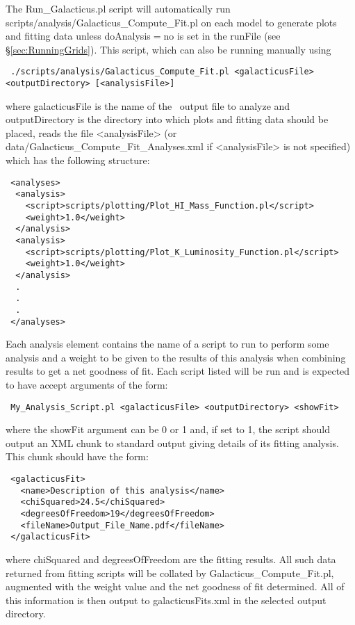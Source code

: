 The {\normalfont \ttfamily Run\_Galacticus.pl} script will automatically run {\normalfont \ttfamily scripts/analysis/Galacticus\_Compute\_Fit.pl} on each model to generate plots and fitting data unless {\normalfont \ttfamily doAnalysis}$=${\normalfont \ttfamily no} is set in the {\normalfont \ttfamily runFile} (see \S\ref{sec:RunningGrids}). This script, which can also be running manually using
\begin{verbatim}
 ./scripts/analysis/Galacticus_Compute_Fit.pl <galacticusFile> <outputDirectory> [<analysisFile>]
\end{verbatim}
where {\normalfont \ttfamily galacticusFile} is the name of the \glc\ output file to analyze and {\normalfont \ttfamily outputDirectory} is the directory into which plots and fitting data should be placed, reads the file {\normalfont \ttfamily \textless analysisFile\textgreater} (or {\normalfont \ttfamily data/Galacticus\_Compute\_Fit\_Analyses.xml} if {\normalfont \ttfamily \textless analysisFile\textgreater} is not specified) which has the following structure:
\begin{verbatim}
 <analyses>
  <analysis>
    <script>scripts/plotting/Plot_HI_Mass_Function.pl</script>
    <weight>1.0</weight>
  </analysis>
  <analysis>
    <script>scripts/plotting/Plot_K_Luminosity_Function.pl</script>
    <weight>1.0</weight>
  </analysis>
  .
  .
  .
 </analyses>
\end{verbatim}
Each {\normalfont \ttfamily analysis} element contains the name of a script to run to perform some analysis and a weight to be given to the results of this analysis when combining results to get a net goodness of fit. Each script listed will be run and is expected to have accept arguments of the form:
\begin{verbatim}
 My_Analysis_Script.pl <galacticusFile> <outputDirectory> <showFit>
\end{verbatim}
where the {\normalfont \ttfamily showFit} argument can be 0 or 1 and, if set to 1, the script should output an XML chunk to standard output giving details of its fitting analysis. This chunk should have the form:
\begin{verbatim}
 <galacticusFit>
   <name>Description of this analysis</name>
   <chiSquared>24.5</chiSquared>
   <degreesOfFreedom>19</degreesOfFreedom>
   <fileName>Output_File_Name.pdf</fileName>
 </galacticusFit>
\end{verbatim}
where {\normalfont \ttfamily chiSquared} and {\normalfont \ttfamily degreesOfFreedom} are the fitting results. All such data returned from fitting scripts will be collated by {\normalfont \ttfamily Galacticus\_Compute\_Fit.pl}, augmented with the weight value and the net goodness of fit determined. All of this information is then output to {\normalfont \ttfamily galacticusFits.xml} in the selected output directory.

